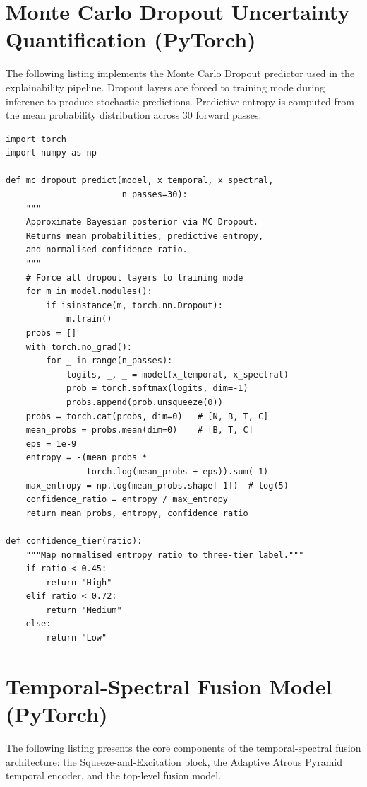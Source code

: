 \section{Monte Carlo Dropout Uncertainty Quantification (PyTorch)}

The following listing implements the Monte Carlo Dropout predictor used in the explainability pipeline. Dropout layers are forced to training mode during inference to produce stochastic predictions. Predictive entropy is computed from the mean probability distribution across 30 forward passes.

\begin{verbatim}
import torch
import numpy as np

def mc_dropout_predict(model, x_temporal, x_spectral,
                       n_passes=30):
    """
    Approximate Bayesian posterior via MC Dropout.
    Returns mean probabilities, predictive entropy,
    and normalised confidence ratio.
    """
    # Force all dropout layers to training mode
    for m in model.modules():
        if isinstance(m, torch.nn.Dropout):
            m.train()
    probs = []
    with torch.no_grad():
        for _ in range(n_passes):
            logits, _, _ = model(x_temporal, x_spectral)
            prob = torch.softmax(logits, dim=-1)
            probs.append(prob.unsqueeze(0))
    probs = torch.cat(probs, dim=0)   # [N, B, T, C]
    mean_probs = probs.mean(dim=0)    # [B, T, C]
    eps = 1e-9
    entropy = -(mean_probs *
                torch.log(mean_probs + eps)).sum(-1)
    max_entropy = np.log(mean_probs.shape[-1])  # log(5)
    confidence_ratio = entropy / max_entropy
    return mean_probs, entropy, confidence_ratio

def confidence_tier(ratio):
    """Map normalised entropy ratio to three-tier label."""
    if ratio < 0.45:
        return "High"
    elif ratio < 0.72:
        return "Medium"
    else:
        return "Low"
\end{verbatim}

\section{Temporal-Spectral Fusion Model (PyTorch)}

The following listing presents the core components of the temporal-spectral fusion architecture: the Squeeze-and-Excitation block, the Adaptive Atrous Pyramid temporal encoder, and the top-level fusion model.

